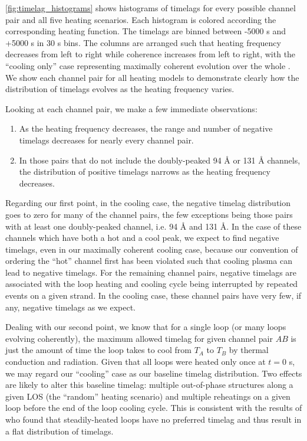 \autoref{fig:timelag_histograms} shows histograms of timelags for every possible channel pair and all five heating scenarios. Each histogram is colored according the corresponding heating function. The timelags are binned between -5000 s and +5000 s in 30 s bins. The columns are arranged such that heating frequency decreases from left to right while coherence increases from left to right, with the ``cooling only'' case representing maximally coherent evolution over the whole \AR{}. We show each channel pair for all heating models to demonstrate clearly how the distribution of timelags evolves as the heating frequency varies.

Looking at each channel pair, we make a few immediate observations: 
\begin{enumerate}
\item As the heating frequency decreases, the range and number of negative timelags decreases for nearly every channel pair.
\item In those pairs that do not include the doubly-peaked 94 \AA{} or 131 \AA{} channels, the distribution of positive timelags narrows as the heating frequency decreases.
\end{enumerate}

Regarding our first point, in the cooling case, the negative timelag distribution goes to zero for many of the channel pairs, the few exceptions being those pairs with at least one doubly-peaked channel, i.e. 94 \AA{} and 131 \AA{}. In the case of these channels which have both a hot and a cool peak, we expect to find negative timelags, even in our maximally coherent cooling case, because our convention of ordering the ``hot'' channel first has been violated such that cooling plasma can lead to negative timelags. For the remaining channel pairs, negative timelags are associated with the loop heating and cooling cycle being interrupted by repeated events on a given strand. In the cooling case, these channel pairs have very few, if any, negative timelags as we expect. 

Dealing with our second point, we know that for a single loop (or many loops evolving coherently), the maximum allowed timelag for given channel pair $AB$ is just the amount of time the loop takes to cool from $T_A$ to $T_B$ by thermal conduction and radiation. Given that all loops were heated only once at $t=0$ s, we may regard our ``cooling'' case as our baseline timelag distribution. Two effects are likely to alter this baseline timelag: multiple out-of-phase structures along a given LOS (the ``random'' heating scenario) and multiple reheatings on a given loop before the end of the loop cooling cycle. This is consistent with the results of \citet{viall_signatures_2016} who found that steadily-heated loops have no preferred timelag and thus result in a flat distribution of timelags. 

